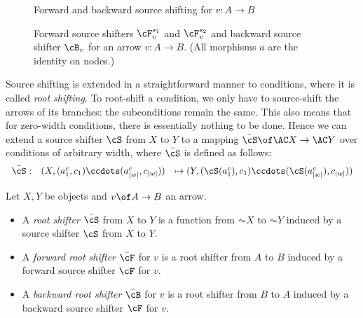 \begin{figure}[t]
\centering

\caption{Forward and backward source shifting for $v:A\to B$}
\end{figure}

\begin{figure}
\centering

\caption{Forward source shifters $\cF_v^{s_1}$ and $\cF_v^{s_2}$ and backward source shifter $\cB_v$ for an arrow $v:A\to B$. (All morphisms $a$ are the identity on nodes.)}
\end{figure}

Source shifting is extended in a straightforward manner to conditions, where it is called \emph{root shifting}. To root-shift a condition, we only have to source-shift the arrows of its branches: the subconditions remain the same. This also means that for zero-width conditions, there is essentially nothing to be done. Hence we can extend a source shifter $\cS$ from $X$ to $Y$ to a mapping $\bar\cS\of \AC X\to \AC Y$ over conditions of arbitrary width,  where $\bar\cS$ is defined as follows:
\[\begin{array}{rrl}
\bar\cS: & (X,(a^c_1,c_1)\ccdots (a^c_{|w|},c_{|w|})) & \mapsto (Y,(\cS(a^c_1),c_1)\ccdots (\cS(a^c_{|w|}),c_{|w|}))  
\end{array}\]

\begin{definition}
Let $X,Y$ be objects and $v\of A\to B$ an arrow.
\begin{itemize}[topsep=\smallskipamount]
\item A \emph{root shifter} $\bar\cS$ from $X$ to $Y$ is a function from $\AC X$ to $\AC Y$ induced by a source shifter $\cS$ from $X$ to $Y$.

\item A \emph{forward root shifter} $\bar\cF$ for $v$ is a root shifter from $A$ to $B$ induced by a forward source shifter $\cF$ for $v$.

\item A \emph{backward root shifter} $\bar\cB$ for $v$ is a root shifter from $B$ to $A$  induced by a backward source shifter $\cF$ for $v$.

\end{itemize}
\end{definition}
%

